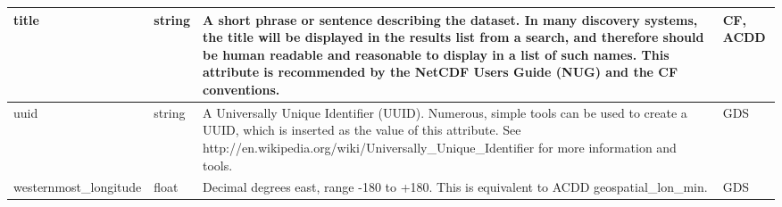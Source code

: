 \begin{longtable}{|p{}|p{}|p{}|p{}|}
\rowcolor{LightCyan} title & string & A short phrase or sentence describing the dataset. In many discovery systems, the title will be displayed in the results list from a search, and therefore should be human readable and reasonable to display in a list of such names. This attribute is recommended by the NetCDF Users Guide (NUG) and the CF conventions. & CF, ACDD \\ \hline

\rowcolor{LightCyan} uuid & string & A Universally Unique Identifier (UUID). Numerous, simple tools can be used to create a UUID, which is inserted as the value of this attribute. See http://en.wikipedia.org/wiki/Universally\_Unique\_Identifier for more information and tools. & GDS \\ \hline

\rowcolor{LightCyan} westernmost\_longitude & float & Decimal degrees east, range -180 to +180. This is equivalent to ACDD geospatial\_lon\_min. & GDS \\ \hline

\end{longtable}